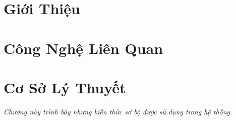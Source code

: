 \documentclass[12pt]{report}
\begin{document}

\setmainfont{Times New Roman}

\clearpage
{} 













\listoftables
\newpage


\listoffigures
\newpage


\chapter{Giới Thiệu}










\chapter{Công Nghệ Liên Quan}
\label{chapter:related}




\chapter{Cơ Sở Lý Thuyết}

\textit{Chương này trình bày nhưng kiến thức sơ bộ được sử dụng trong hệ thống.}











\end{document}
